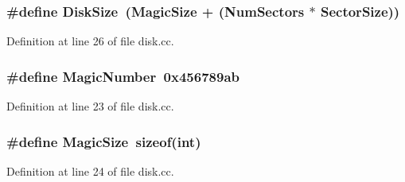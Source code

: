 \subsubsection[{Disk\+Size}]{\setlength{\rightskip}{0pt plus 5cm}\#define Disk\+Size~({\bf Magic\+Size} + ({\bf Num\+Sectors} $\ast$ {\bf Sector\+Size}))}\label{disk_8cc_a9815f820b9a9d47afed6c5c855228c45}


Definition at line 26 of file disk.\+cc.

\subsubsection[{Magic\+Number}]{\setlength{\rightskip}{0pt plus 5cm}\#define Magic\+Number~0x456789ab}\label{disk_8cc_a0221e53d8505517e0ec9d01b71cec9c7}


Definition at line 23 of file disk.\+cc.

\subsubsection[{Magic\+Size}]{\setlength{\rightskip}{0pt plus 5cm}\#define Magic\+Size~sizeof(int)}\label{disk_8cc_af1c8beed1a7d50b8ffcacd9b2d4b6353}


Definition at line 24 of file disk.\+cc.

